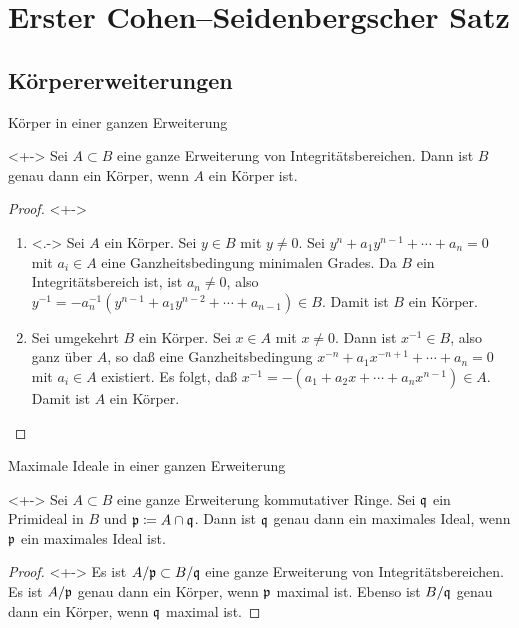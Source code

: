 \section{Erster Cohen--Seidenbergscher Satz}

\subsection{Körpererweiterungen}

\begin{frame}{Körper in einer ganzen Erweiterung}
	\begin{proposition}<+->
		\label{prop:fields_and_integral_extensions}
		Sei \(A \subset B\) eine ganze Erweiterung von Integritätsbereichen.
		Dann ist \(B\) genau dann ein Körper, wenn \(A\) ein Körper ist.
	\end{proposition}
	\begin{proof}<+->
		\begin{enumerate}[<+->]
		\item<.->
			Sei \(A\) ein Körper. Sei \(y \in B\) mit \(y \neq 0\). Sei
			\(y^n + a_1 y^{n - 1} + \dotsb + a_n = 0\) mit \(a_i \in A\) eine
			Ganzheitsbedingung minimalen Grades. Da \(B\) ein
			Integritätsbereich ist, ist \(a_n \neq 0\), also
			\(y^{-1} = -a_n^{-1} (y^{n - 1} + a_1 y^{n - 2} + \dotsb
			+ a_{n - 1}) \in B\). Damit ist \(B\) ein Körper.
		\item
			Sei umgekehrt \(B\) ein Körper. Sei \(x \in A\) mit \(x \neq 0\).
			Dann ist \(x^{-1} \in B\), also ganz über \(A\), so daß eine
			Ganzheitsbedingung \(x^{-n} + a_1 x^{-n + 1} + \dotsb + a_n = 0\)
			mit \(a_i \in A\) existiert. Es folgt, daß
			\(x^{-1} = -(a_1 + a_2 x + \dotsb + a_n x^{n - 1}) \in A\). Damit
			ist \(A\) ein Körper. 
			\qedhere
		\end{enumerate}
	\end{proof}
\end{frame}

\begin{frame}{Maximale Ideale in einer ganzen Erweiterung}
	\begin{corollary}<+->
		Sei \(A \subset B\) eine ganze Erweiterung kommutativer Ringe. Sei
		\(\mathfrak{q}\) ein Primideal in \(B\) und \(\mathfrak{p} \coloneqq A \cap
		\mathfrak{q}\). Dann ist \(\mathfrak{q}\) genau dann ein maximales Ideal, wenn
		\(\mathfrak{p}\) ein maximales Ideal ist.
	\end{corollary}
	\begin{proof}<+->
		Es ist \(A/\mathfrak{p} \subset B/\mathfrak{q}\) eine ganze Erweiterung
		von Integritätsbereichen. Es ist \(A/\mathfrak{p}\) genau dann ein Körper,
		wenn \(\mathfrak{p}\) maximal ist. Ebenso ist \(B/\mathfrak{q}\) genau dann
		ein Körper, wenn \(\mathfrak{q}\) maximal ist.
	\end{proof}
\end{frame}

